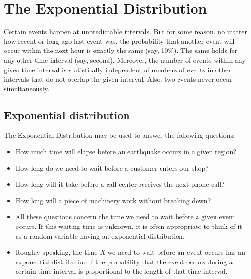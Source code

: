 \documentclass[a4paper,12pt]{article}
\begin{document}
\section*{The Exponential Distribution}


Certain events happen at unpredictable intervals. But for some reason, no matter how recent or long ago last event was, the probability that another event will occur within the next hour is exactly the same (say, 10\%). The same holds for any other time interval (say, second). Moreover, the number of events within any given time interval is statistically independent of numbers of events in other intervals that do not overlap the given interval. Also, two events never occur simultaneously.




\subsection*{Exponential distribution}

The Exponential Distribution may be used to answer the following questions:
\begin{itemize}
\item How much time will elapse before an earthquake occurs in a given region?
\item How long do we need to wait before a customer enters our shop?
\item How long will it take before a call center receives the next phone call?
\item How long will a piece of machinery work without breaking down?
\end{itemize}




\begin{itemize}
\item All these questions concern the time we need to wait before a given event occurs. If this waiting time is unknown, it is often appropriate to think of it as a random variable having an exponential distribution.
\item Roughly speaking, the time $X$ we need to wait before an event occurs has an exponential distribution if the probability that the event occurs during a certain time interval is proportional to the length of that time interval.

\end{itemize}

\end{document}
